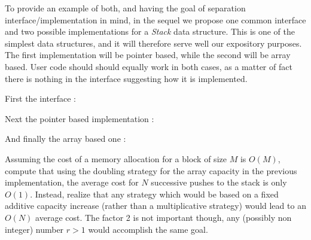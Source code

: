 \documentclass[12pt]{article}
\theoremstyle{plain}
\theoremstyle{remark}
\begin{document}
To provide an example of both, and having the goal of separation 
interface/implementation in mind, in the sequel we propose one common 
interface and two possible implementations for a {\it Stack} data structure.
This is one of the simplest data structures, and it will therefore serve well
our expository purposes. The first implementation will be pointer based, while 
the second will be array based. 
User code should should equally work in both cases, as a matter of fact there
is nothing in the interface suggesting how it is implemented.

First the interface :


Next the pointer based implementation :


And finally the array based one :


 Assuming the cost of a memory allocation for a block
of size $M$ is $O(M)$, compute that using the doubling strategy for the array
capacity in the previous implementation, the average cost for $N$ successive
pushes to the stack is only $O(1)$. Instead, realize that any strategy which
would be based on a fixed additive capacity increase (rather than a 
multiplicative strategy) would lead to an $O(N)$ average cost. The factor 2 is
not important though, any (possibly non integer) number $r>1$ would accomplish
the same goal.  
\end{document}

